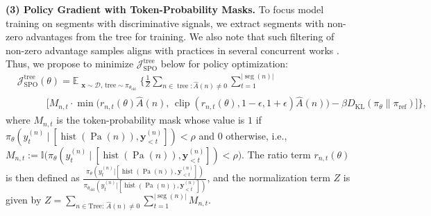 \noindent\textbf{(3) Policy Gradient with Token-Probability Masks.}
\label{subsec:policy-optimization-using-edges-with-non-zero-advantage}
To focus model training on segments with discriminative signals, we extract segments with non-zero advantages from the tree for training. We also note that such filtering of non-zero advantage samples aligns with practices in several concurrent works \cite{yu2025dapoopensourcellmreinforcement, lin2025cppoacceleratingtraininggroup}. Thus, we propose to minimize \(\mathcal{J}_{\text{SPO}}^{\text{tree}}\) below for policy optimization: 
\begin{equation}
\begin{aligned}\label{eq:spo_tree}
&\mathcal J_{\text{SPO}}^{\operatorname{tree}}(\theta)= 
\mathbb E_{\substack{\boldsymbol x\sim\mathcal D,\,\text{tree}\sim\pi_{\theta_{\text{old}}}}}\Bigg\{
\frac{1}{Z}
\sum_{n\in\operatorname{tree}: \hat A(n)\neq 0}
\sum_{t=1}^{|\operatorname{seg}(n)|}\\[-0.5em]
&\qquad\quad \bigg[M_{n,t}\cdot\min\Big(r_{n,t}(\theta)\hat A(n),\,\operatorname{clip}(r_{n,t}(\theta),1-\epsilon,1+\epsilon)\hat A(n)\Big) 
-\beta D_{\mathrm{KL}}(\pi_{\theta}\|\pi_{\text{ref}})\bigg]
\Bigg\},
\end{aligned}
\end{equation}
where \(M_{n,t}\) is the token-probability mask whose value is \(1\) if \(
\pi_{\theta}(y^{(n)}_t~|~ [\operatorname{hist}(\operatorname{Pa}(n)), \boldsymbol y^{(n)}_{<t}]) < \rho\) and \(0\) otherwise, i.e.,
\(
M_{n,t}:= \mathbb{I}\Big(\pi_{\theta}(y^{(n)}_t~|~ [\operatorname{hist}(\operatorname{Pa}(n)), \boldsymbol y^{(n)}_{<t}]) < \rho\Big).
\)
The ratio term \(r_{n,t}(\theta)\) is then defined as \(\frac{\pi_{\theta}(y^{(n)}_t|[\operatorname{hist}(\operatorname{Pa}(n)),\boldsymbol y^{(n)}_{<t}])}{\pi_{\theta_{\text{old}}}(y^{(n)}_t|[\operatorname{hist}(\operatorname{Pa}(n)),\boldsymbol y^{(n)}_{<t}])}\), and the normalization term \(Z\) is given by \(Z = \sum_{n\in \text{Tree}:\,\hat A(n)\neq 0}\sum_{t=1}^{|\operatorname{seg}(n)|}M_{n,t}\).